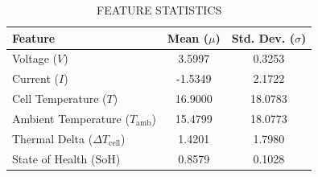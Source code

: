 \begin{table}[H]
    \caption{FEATURE STATISTICS}
    \label{tab:feature_stats}
    \begin{center}
        \footnotesize
        \begin{tabular}{lcc}
            \hline
            \textbf{Feature} & \textbf{Mean ($\mu$)} & \textbf{Std. Dev. ($\sigma$)} \\
            \hline
            Voltage ($V$) & 3.5997 & 0.3253 \\
            Current ($I$) & -1.5349 & 2.1722 \\
            Cell Temperature ($T$) & 16.9000 & 18.0783 \\
            Ambient Temperature ($T_{\text{amb}}$) & 15.4799 & 18.0773 \\
            Thermal Delta ($\Delta T_{\text{cell}}$) & 1.4201 & 1.7980 \\
            State of Health ($\text{SoH}$) & 0.8579 & 0.1028 \\
            \hline
        \end{tabular}
    \end{center}
\end{table}
